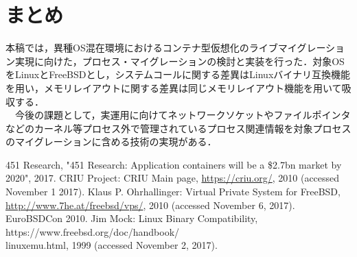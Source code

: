 \documentclass{ipsjpapers}
\begin{document}
\section{まとめ}
本稿では，異種OS混在環境におけるコンテナ型仮想化のライブマイグレーション実現に向けた，プロセス・マイグレーションの検討と実装を行った．対象OSをLinuxとFreeBSDとし，システムコールに関する差異はLinuxバイナリ互換機能を用い，メモリレイアウトに関する差異は同じメモリレイアウト機能を用いて吸収する．\\
　今後の課題として，実運用に向けてネットワークソケットやファイルポインタなどのカーネル等プロセス外で管理されているプロセス関連情報を対象プロセスのマイグレーションに含める技術の実現がある．
\begin{thebibliography}{99}

  	451 Research, "451 Research: Application containers will be a \$2.7bn market by 2020", 2017.
  	CRIU Project: CRIU Main page, \url{https://criu.org/}, 2010 (accessed November 1 2017).
  Klaus P. Ohrhallinger: Virtual Private System for FreeBSD, \url{http://www.7he.at/freebsd/vps/}, 2010 (accessed November 6, 2017). EuroBSDCon 2010.
  Jim Mock: Linux Binary Compatibility, https://www.freebsd.org\slash{}doc\slash{}handbook\slash{}\\linuxemu.html, 1999 (accessed November 2, 2017).
\end{thebibliography}
\end{document}
